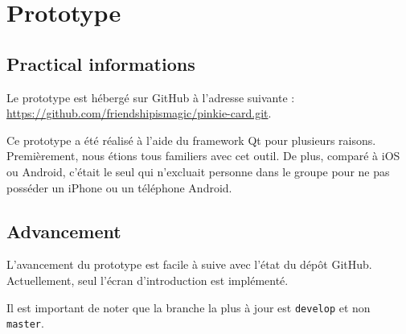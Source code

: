 \documentclass[a4paper,12pt]{article}
\begin{document}
\section{Prototype}

\subsection{Practical informations}

Le prototype est hébergé sur GitHub à l'adresse suivante : \\
\url{https://github.com/friendshipismagic/pinkie-card.git}.

Ce prototype a été réalisé à l'aide du framework Qt pour plusieurs raisons. Premièrement, nous étions tous familiers
avec cet outil. De plus, comparé à iOS ou Android, c'était le seul qui n'excluait personne dans le groupe pour ne pas
posséder un iPhone ou un téléphone Android.

\subsection{Advancement}

L'avancement du prototype est facile à suive avec l'état du dépôt GitHub. Actuellement, seul l'écran d'introduction
est implémenté.

Il est important de noter que la branche la plus à jour est \texttt{develop} et non \texttt{master}.
\end{document}
